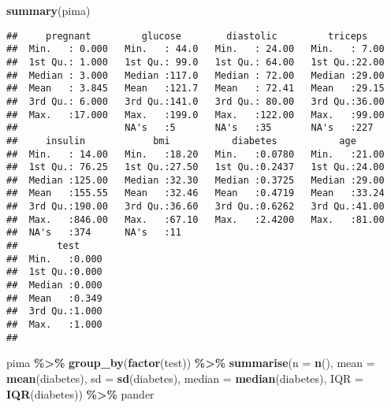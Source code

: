 \documentclass[
]{article}
\newenvironment{Shaded}{\begin{snugshade}}{\end{snugshade}}
\newcommand{\AttributeTok}[1]{\textcolor[rgb]{0.13,0.29,0.53}{#1}}
\newcommand{\FunctionTok}[1]{\textcolor[rgb]{0.13,0.29,0.53}{\textbf{#1}}}
\newcommand{\NormalTok}[1]{#1}
\newcommand{\SpecialCharTok}[1]{\textcolor[rgb]{0.81,0.36,0.00}{\textbf{#1}}}
\begin{document}
\begin{Shaded}
\begin{Highlighting}[]
    \FunctionTok{summary}\NormalTok{(pima)}
\end{Highlighting}
\end{Shaded}

\begin{verbatim}
##     pregnant         glucose        diastolic         triceps     
##  Min.   : 0.000   Min.   : 44.0   Min.   : 24.00   Min.   : 7.00  
##  1st Qu.: 1.000   1st Qu.: 99.0   1st Qu.: 64.00   1st Qu.:22.00  
##  Median : 3.000   Median :117.0   Median : 72.00   Median :29.00  
##  Mean   : 3.845   Mean   :121.7   Mean   : 72.41   Mean   :29.15  
##  3rd Qu.: 6.000   3rd Qu.:141.0   3rd Qu.: 80.00   3rd Qu.:36.00  
##  Max.   :17.000   Max.   :199.0   Max.   :122.00   Max.   :99.00  
##                   NA's   :5       NA's   :35       NA's   :227    
##     insulin            bmi           diabetes           age       
##  Min.   : 14.00   Min.   :18.20   Min.   :0.0780   Min.   :21.00  
##  1st Qu.: 76.25   1st Qu.:27.50   1st Qu.:0.2437   1st Qu.:24.00  
##  Median :125.00   Median :32.30   Median :0.3725   Median :29.00  
##  Mean   :155.55   Mean   :32.46   Mean   :0.4719   Mean   :33.24  
##  3rd Qu.:190.00   3rd Qu.:36.60   3rd Qu.:0.6262   3rd Qu.:41.00  
##  Max.   :846.00   Max.   :67.10   Max.   :2.4200   Max.   :81.00  
##  NA's   :374      NA's   :11                                      
##       test      
##  Min.   :0.000  
##  1st Qu.:0.000  
##  Median :0.000  
##  Mean   :0.349  
##  3rd Qu.:1.000  
##  Max.   :1.000  
## 
\end{verbatim}

\begin{Shaded}
\begin{Highlighting}[]
\NormalTok{    pima }\SpecialCharTok{\%\textgreater{}\%}
      \FunctionTok{group\_by}\NormalTok{(}\FunctionTok{factor}\NormalTok{(test)) }\SpecialCharTok{\%\textgreater{}\%}
      \FunctionTok{summarise}\NormalTok{(}\AttributeTok{n =} \FunctionTok{n}\NormalTok{(), }\AttributeTok{mean =} \FunctionTok{mean}\NormalTok{(diabetes), }\AttributeTok{sd =} \FunctionTok{sd}\NormalTok{(diabetes), }
      \AttributeTok{median =} \FunctionTok{median}\NormalTok{(diabetes), }\AttributeTok{IQR =} \FunctionTok{IQR}\NormalTok{(diabetes)) }\SpecialCharTok{\%\textgreater{}\%}\NormalTok{ pander}
\end{Highlighting}
\end{Shaded}
\end{document}
